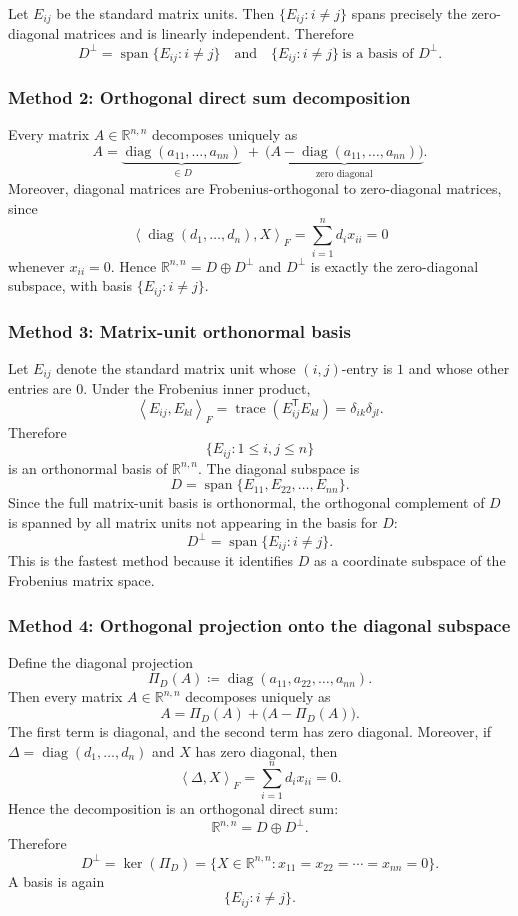\documentclass[12pt]{article}
\newcommand{\df}{\coloneqq}
\newcommand{\R}{\mathbb{R}}
\DeclareMathOperator{\Span}{span}
\DeclareMathOperator{\tr}{trace}
\DeclareMathOperator{\diag}{diag}
\newcommand{\ip}[2]{\left\langle #1,#2\right\rangle}
\begin{document}
Let $E_{ij}$ be the standard matrix units. Then $\{E_{ij}: i\neq j\}$ spans precisely the zero-diagonal matrices and is linearly independent.
Therefore
\[
\boxed{\,D^\perp=\Span\{E_{ij}: i\neq j\}\quad\text{and}\quad \{E_{ij}: i\neq j\}\ \text{is a basis of }D^\perp.\,}
\]

\subsubsection{Method 2: Orthogonal direct sum decomposition}
Every matrix $A\in\R^{n,n}$ decomposes uniquely as
\[
A=\underbrace{\diag(a_{11},\dots,a_{nn})}_{\in D}\ +\ \underbrace{\bigl(A-\diag(a_{11},\dots,a_{nn})\bigr)}_{\text{zero diagonal}}.
\]
Moreover, diagonal matrices are Frobenius-orthogonal to zero-diagonal matrices, since
\[
\ip{\diag(d_1,\dots,d_n)}{X}_F=\sum_{i=1}^n d_i x_{ii}=0
\]
whenever $x_{ii}=0$. Hence $\R^{n,n}=D\oplus D^\perp$ and $D^\perp$ is exactly the zero-diagonal subspace,
with basis $\{E_{ij}:i\neq j\}$.


\subsubsection{Method 3: Matrix-unit orthonormal basis}
Let $E_{ij}$ denote the standard matrix unit whose $(i,j)$-entry is $1$ and whose other entries are $0$.
Under the Frobenius inner product,
\[
\ip{E_{ij}}{E_{kl}}_F
=\tr(E_{ij}^{\mathsf T}E_{kl})
=\delta_{ik}\delta_{jl}.
\]
Therefore
\[
\{E_{ij}:1\le i,j\le n\}
\]
is an orthonormal basis of $\R^{n,n}$.
The diagonal subspace is
\[
D=\Span\{E_{11},E_{22},\dots,E_{nn}\}.
\]
Since the full matrix-unit basis is orthonormal, the orthogonal complement of $D$ is spanned by all matrix units not appearing in the basis for $D$:
\[
\boxed{\,D^{\perp}=\Span\{E_{ij}:i\ne j\}.\,}
\]
This is the fastest method because it identifies $D$ as a coordinate subspace of the Frobenius matrix space.

\subsubsection{Method 4: Orthogonal projection onto the diagonal subspace}
Define the diagonal projection
\[
\Pi_D(A)\df \diag(a_{11},a_{22},\dots,a_{nn}).
\]
Then every matrix $A\in\R^{n,n}$ decomposes uniquely as
\[
A=\Pi_D(A)+\bigl(A-\Pi_D(A)\bigr).
\]
The first term is diagonal, and the second term has zero diagonal. Moreover, if $\Delta=\diag(d_1,\dots,d_n)$ and $X$ has zero diagonal, then
\[
\ip{\Delta}{X}_F=\sum_{i=1}^{n}d_i x_{ii}=0.
\]
Hence the decomposition is an orthogonal direct sum:
\[
\R^{n,n}=D\oplus D^{\perp}.
\]
Therefore
\[
D^{\perp}=\ker(\Pi_D)=\{X\in\R^{n,n}:x_{11}=x_{22}=\cdots=x_{nn}=0\}.
\]
A basis is again
\[
\boxed{\,\{E_{ij}:i\ne j\}.\,}
\]
\end{document}
